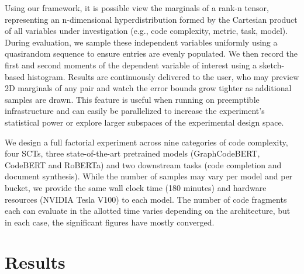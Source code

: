 \documentclass[usenames,dvipsnames]{article} %
\begin{document}
  Using our framework, it is possible view the marginals of a rank-n tensor, representing an n-dimensional hyperdistribution formed by the Cartesian product of all variables under investigation (e.g., code complexity, metric, task, model). During evaluation, we sample these independent variables uniformly using a quasirandom sequence to ensure entries are evenly populated. We then record the first and second moments of the dependent variable of interest using a sketch-based histogram. Results are continuously delivered to the user, who may preview 2D marginals of any pair and watch the error bounds grow tighter as additional samples are drawn. This feature is useful when running on preemptible infrastructure and can easily be parallelized to increase the experiment's statistical power or explore larger subspaces of the experimental design space.

  We design a full factorial experiment across nine categories of code complexity, four SCTs, three state-of-the-art pretrained models (GraphCodeBERT, CodeBERT and RoBERTa) and two downstream tasks (code completion and document synthesis). While the number of samples may vary per model and per bucket, we provide the same wall clock time (180 minutes) and hardware resources (NVIDIA Tesla V100) to each model. The number of code fragments each can evaluate in the allotted time varies depending on the architecture, but in each case, the significant figures have mostly converged.

  \section{Results}\label{sec:results}
\end{document}
